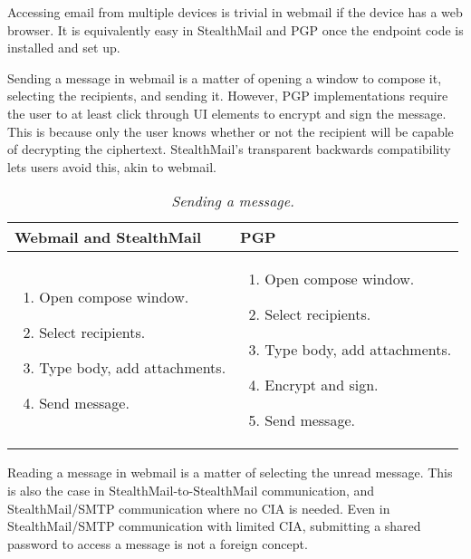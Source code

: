 Accessing email from multiple devices is trivial in webmail if the device has a web browser.  It is equivalently easy in StealthMail and PGP once the endpoint code is installed and set up.

Sending a message in webmail is a matter of opening a window to compose it, selecting the recipients, and sending it.  However, PGP implementations require the user to at least click through UI elements to encrypt and sign the message.  This is because only the user knows whether or not the recipient will be capable of decrypting the ciphertext.  StealthMail's transparent backwards compatibility lets users avoid this, akin to webmail.

\begin{table}[ht!]
\begin{tabular}{ | L{3.5cm} | L{3.5cm} |}
\hline
\textbf{Webmail and StealthMail} & \textbf{PGP} \\
\hline
\vspace{-3mm}
\begin{enumerate}
  \item{Open compose window.}
  \item{Select recipients.} 
  \item{Type body, add attachments.}
  \item{Send message.}
\end{enumerate} 
\vspace{-\topsep} &

\vspace{-3mm}
\begin{enumerate}
  \item{Open compose window.}
  \item{Select recipients.}
  \item{Type body, add attachments.}
  \item{Encrypt and sign.}
  \item{Send message.}
\end{enumerate} 
\vspace{-\topsep} \\

\hline
\end{tabular}
\caption{\it Sending a message.}
\label{tab:account-creation}
\end{table}


Reading a message in webmail is a matter of selecting the unread message.  This is also the case in StealthMail-to-StealthMail communication, and StealthMail/SMTP communication where no CIA is needed.  Even in StealthMail/SMTP communication with limited CIA, submitting a shared password to access a message is not a foreign concept.

